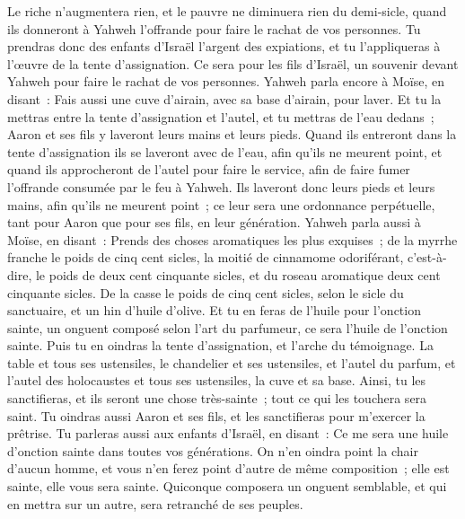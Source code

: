 \begin{multicols}{2}
Le riche n'augmentera rien, et le pauvre ne diminuera rien du demi-sicle, quand ils donneront à Yahweh l'offrande pour faire le rachat de vos personnes.
Tu prendras donc des enfants d'Israël l'argent des expiations, et tu l'appliqueras à l'œuvre de la tente d'assignation. Ce sera pour les fils d'Israël, un souvenir devant Yahweh pour faire le rachat de vos personnes.
Yahweh parla encore à Moïse, en disant~:
Fais aussi une cuve d'airain, avec sa base d'airain, pour laver. Et tu la mettras entre la tente d'assignation et l'autel, et tu mettras de l'eau dedans~;
Aaron et ses fils y laveront leurs mains et leurs pieds.
Quand ils entreront dans la tente d'assignation ils se laveront avec de l'eau, afin qu'ils ne meurent point, et quand ils approcheront de l'autel pour faire le service, afin de faire fumer l'offrande consumée par le feu à Yahweh.
Ils laveront donc leurs pieds et leurs mains, afin qu'ils ne meurent point~; ce leur sera une ordonnance perpétuelle, tant pour Aaron que pour ses fils, en leur génération.
Yahweh parla aussi à Moïse, en disant~:
Prends des choses aromatiques les plus exquises~; de la myrrhe franche le poids de cinq cent sicles, la moitié de cinnamome odoriférant, c'est-à-dire, le poids de deux cent cinquante sicles, et du roseau aromatique deux cent cinquante sicles.
De la casse le poids de cinq cent sicles, selon le sicle du sanctuaire, et un hin d'huile d'olive.
Et tu en feras de l'huile pour l'onction sainte, un onguent composé selon l'art du parfumeur, ce sera l'huile de l'onction sainte.
Puis tu en oindras la tente d'assignation, et l'arche du témoignage.
La table et tous ses ustensiles, le chandelier et ses ustensiles, et l'autel du parfum,
 et l'autel des holocaustes et tous ses ustensiles, la cuve et sa base.
Ainsi, tu les sanctifieras, et ils seront une chose très-sainte~; tout ce qui les touchera sera saint.
Tu oindras aussi Aaron et ses fils, et les sanctifieras pour m'exercer la prêtrise.
Tu parleras aussi aux enfants d'Israël, en disant~: Ce me sera une huile d'onction sainte dans toutes vos générations.
On n'en oindra point la chair d'aucun homme, et vous n'en ferez point d'autre de même composition~; elle est sainte, elle vous sera sainte.
Quiconque composera un onguent semblable, et qui en mettra sur un autre, sera retranché de ses peuples.

\end{multicols}
